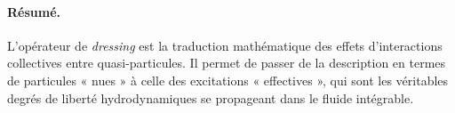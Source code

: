 \paragraph{Résumé.}
L’opérateur de \textit{dressing} est la traduction mathématique des effets
d’interactions collectives entre quasi-particules.
Il permet de passer de la description en termes de particules « nues »
à celle des excitations « effectives », qui sont les véritables degrés de liberté
hydrodynamiques se propageant dans le fluide intégrable.

